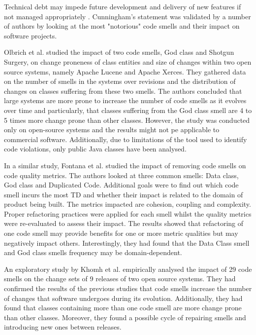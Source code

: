 \documentclass{mprop}
\begin{document}

Technical debt may impede future development and delivery of new features if not
managed appropriately \cite{Cunningham1993}. Cunningham's statement was
validated by a number of authors by looking at the most "notorious" code smells
\cite{Fowler1999} and their impact on software projects.

Olbrich et al. \cite{Olbrich2009} studied the impact of two code smells, God
class and Shotgun Surgery, on change proneness of class entities and size of
changes within two open source systems, namely Apache Lucene and Apache Xerces.
They gathered data on the number of smells in the systems over revisions and the
distribution of changes on classes suffering from these two smells. The authors
concluded that large systems are more prone to increase the number of code
smells as it evolves over time and particularly, that classes suffering from the
God class smell are 4 to 5 times more change prone than other classes. However,
the study was conducted only on open-source systems and the results might not pe
applicable to commercial software. Additionally, due to limitations of the tool
used to identify code violations, only public Java classes have been analysed.

In a similar study, Fontana et al. \cite{Fontana2012} studied the impact of
removing code smells on code quality metrics. The authors looked at three common
smells: Data class, God class and Duplicated Code. Additional goals were to find
out which code smell incurs the most TD and whether their impact is related to
the domain of product being built. The metrics impacted are cohesion, coupling
and complexity. Proper refactoring practices were applied for each smell whilst
the quality metrics were re-evaluated to assess their impact. The results showed
that refactoring of one code smell may provide benefits for one or more metric
qualities but may negatively impact others. Interestingly, they had found that
the Data Class smell and God class smells frequency may be domain-dependent.

An exploratory study by Khomh et al. \cite{Khomh2009} empirically analysed the
impact of 29 code smells on the change sets of 9 releases of two open source
systems. They had confirmed the results of the previous studies that code smells
increase the number of changes that software undergoes during its evolution.
Additionally, they had found that classes containing more than one code smell
are more change prone than other classes. Moreover, they found a possible cycle
of repairing smells and introducing new ones between releases.
\end{document}
